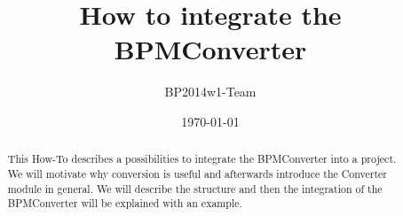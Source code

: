 \documentclass[11pt]{scrartcl}
\title{How to integrate the BPMConverter}
\author{BP2014w1-Team}
\date{\today}
\begin{document}
\maketitle

\begin{abstract}

This How-To describes a possibilities to integrate the BPMConverter into a project.
We will motivate why conversion is useful and afterwards introduce the Converter module in general.
We will describe the structure and then the integration of the BPMConverter will be explained with an example.

\end{abstract}






\end{document}

